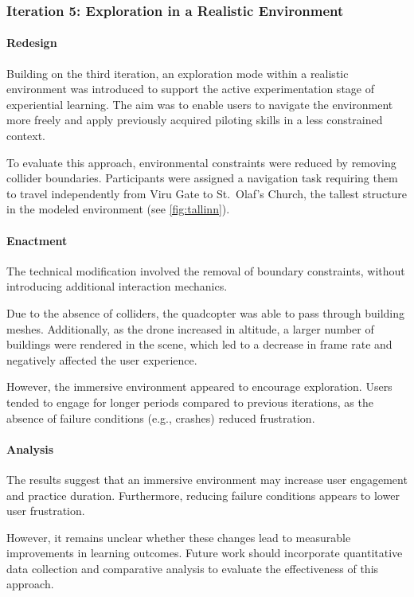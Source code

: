 \subsubsection{Iteration 5: Exploration in a Realistic Environment}

\paragraph{Redesign}

Building on the third iteration, an exploration mode within a realistic environment was introduced to support the active experimentation stage of experiential learning. The aim was to enable users to navigate the environment more freely and apply previously acquired piloting skills in a less constrained context.

To evaluate this approach, environmental constraints were reduced by removing collider boundaries. Participants were assigned a navigation task requiring them to travel independently from Viru Gate to St.\ Olaf's Church, the tallest structure in the modeled environment (see \cref{fig:tallinn}).

\paragraph{Enactment}

The technical modification involved the removal of boundary constraints, without introducing additional interaction mechanics.

Due to the absence of colliders, the quadcopter was able to pass through building meshes. Additionally, as the drone increased in altitude, a larger number of buildings were rendered in the scene, which led to a decrease in frame rate and negatively affected the user experience.

However, the immersive environment appeared to encourage exploration. Users tended to engage for longer periods compared to previous iterations, as the absence of failure conditions (e.g., crashes) reduced frustration.

\paragraph{Analysis}

The results suggest that an immersive environment may increase user engagement and practice duration. Furthermore, reducing failure conditions appears to lower user frustration.

However, it remains unclear whether these changes lead to measurable improvements in learning outcomes. Future work should incorporate quantitative data collection and comparative analysis to evaluate the effectiveness of this approach.
